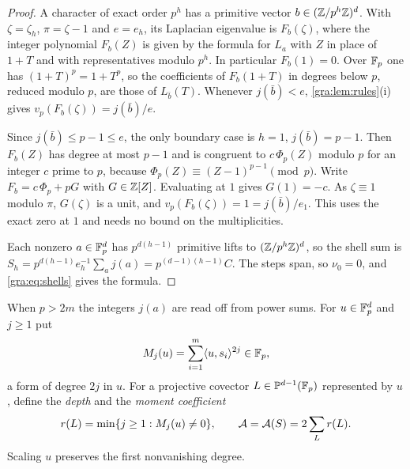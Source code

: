 \begin{proof}
A character of exact order $p^h$ has a primitive vector
$b\in(\mathbb{Z}/p^h\mathbb{Z})^d$. With $\zeta=\zeta_h$, $\pi=\zeta-1$ and $e=e_h$, its
Laplacian eigenvalue is $F_b(\zeta)$, where the integer polynomial $F_b(Z)$
is given by the formula for $L_a$ with $Z$ in place of $1+T$ and with
representatives modulo $p^h$. In particular $F_b(1)=0$. Over $\mathbb{F}_p$ one
has $(1+T)^p=1+T^p$, so the coefficients of $F_b(1+T)$ in degrees below
$p$, reduced modulo $p$, are those of $L_{\bar b}(T)$. Whenever
$j(\bar b)<e$, \cref{gra:lem:rules}(i) gives
$v_p(F_b(\zeta))=j(\bar b)/e$.

Since $j(\bar b)\le p-1\le e$, the only boundary case is $h=1$,
$j(\bar b)=p-1$. Then $F_b(Z)$ has degree at most $p-1$ and is congruent
to $c\,\Phi_p(Z)$ modulo $p$ for an integer $c$ prime to $p$, because
$\Phi_p(Z)\equiv(Z-1)^{p-1}\pmod p$. Write $F_b=c\,\Phi_p+pG$ with
$G\in\mathbb{Z}[Z]$. Evaluating at $1$ gives $G(1)=-c$. As $\zeta\equiv1$ modulo
$\pi$, $G(\zeta)$ is a unit, and $v_p(F_b(\zeta))=1=j(\bar b)/e_1$. This
uses the exact zero at $1$ and needs no bound on the multiplicities.

Each nonzero $a\in\mathbb{F}_p^d$ has $p^{d(h-1)}$ primitive lifts to
$(\mathbb{Z}/p^h\mathbb{Z})^d$, so the shell sum is
$S_h=p^{d(h-1)}e_h^{-1}\sum_aj(a)=p^{(d-1)(h-1)}C$. The steps span, so
$\nu_0=0$, and \eqref{gra:eq:shells} gives the formula.
\end{proof}


When $p>2m$ the integers $j(a)$ are read off from power sums. For
$u\in\mathbb{F}_p^d$ and $j\ge1$ put
\[
 M_j(u)=\sum_{i=1}^m\langle u,s_i\rangle^{2j}\in\mathbb{F}_p ,
\]
a form of degree $2j$ in $u$. For a projective covector
$L\in\mathbb{P}^{d-1}(\mathbb{F}_p)$ represented by $u$, define the \emph{depth} and the
\emph{moment coefficient}
\[
 r(L)=\min\{j\ge1:M_j(u)\ne0\},\qquad\mathcal{A}=\mathcal{A}(S)=2\sum_Lr(L).
\]
Scaling $u$ preserves the first nonvanishing degree.

